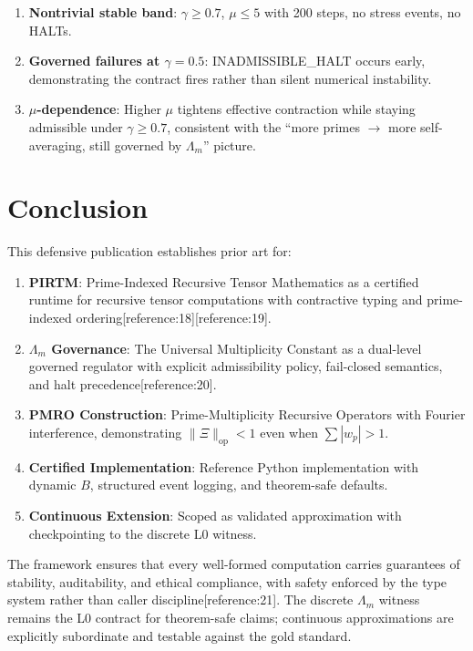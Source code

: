 \documentclass[11pt]{article}
\begin{document}
\begin{enumerate}
\begin{enumerate}
\item \textbf{Nontrivial stable band}: $\gamma \geq 0.7$, $\mu \leq 5$ with 200 steps, no stress events, no HALTs.
\item \textbf{Governed failures at $\gamma=0.5$}: INADMISSIBLE\_HALT occurs early, demonstrating the contract fires rather than silent numerical instability.
\item \textbf{$\mu$-dependence}: Higher $\mu$ tightens effective contraction while staying admissible under $\gamma \geq 0.7$, consistent with the ``more primes $\to$ more self-averaging, still governed by $\Lambda_m$'' picture.
\end{enumerate}

\section{Conclusion}

This defensive publication establishes prior art for:

\begin{enumerate}
\item \textbf{PIRTM}: Prime-Indexed Recursive Tensor Mathematics as a certified runtime for recursive tensor computations with contractive typing and prime-indexed ordering[reference:18][reference:19].
\item \textbf{$\Lambda_m$ Governance}: The Universal Multiplicity Constant as a dual-level governed regulator with explicit admissibility policy, fail-closed semantics, and halt precedence[reference:20].
\item \textbf{PMRO Construction}: Prime-Multiplicity Recursive Operators with Fourier interference, demonstrating $\|\Xi\|_{\mathrm{op}} < 1$ even when $\sum |w_p| > 1$.
\item \textbf{Certified Implementation}: Reference Python implementation with dynamic $B$, structured event logging, and theorem-safe defaults.
\item \textbf{Continuous Extension}: Scoped as validated approximation with checkpointing to the discrete L0 witness.
\end{enumerate}

The framework ensures that every well-formed computation carries guarantees of stability, auditability, and ethical compliance, with safety enforced by the type system rather than caller discipline[reference:21]. The discrete $\Lambda_m$ witness remains the L0 contract for theorem-safe claims; continuous approximations are explicitly subordinate and testable against the gold standard.


\end{enumerate}
\end{document}
